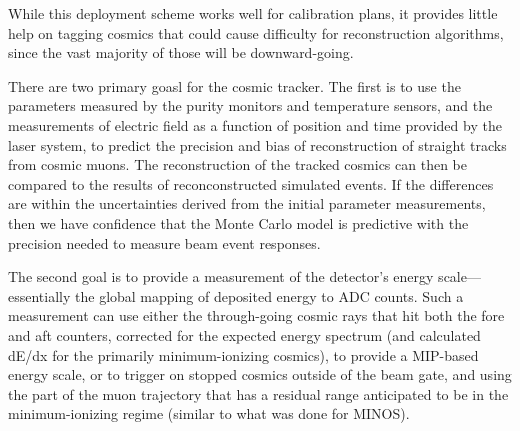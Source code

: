 	While this deployment scheme works well for calibration plans, it
provides little help on tagging cosmics that could cause difficulty for
reconstruction algorithms, since the vast majority of those will be
downward-going.  

	There are two primary goasl for the cosmic tracker. The first is to use
the parameters measured by the purity monitors and temperature sensors, and the
measurements of electric field as a function of position and time provided by
the laser system, to predict the precision and bias of reconstruction of
straight tracks from cosmic muons. The reconstruction of the tracked cosmics
can then be compared to the results of reconconstructed simulated events. If
the differences are within the uncertainties derived from the initial parameter
measurements, then we have confidence that the Monte Carlo model is predictive
with the precision needed to measure beam event responses.  

	The second goal is to provide a measurement of the detector's energy
scale---essentially the global mapping of deposited energy to ADC counts.  Such
a measurement can use either the through-going cosmic rays that hit both the
fore and aft counters, corrected for the expected energy spectrum (and
calculated dE/dx for the primarily minimum-ionizing cosmics), to provide a
MIP-based energy scale, or to trigger on stopped cosmics outside of the beam
gate, and using the part of the muon trajectory that has a residual range
anticipated to be in the minimum-ionizing regime (similar to what was done for
MINOS).  
	


